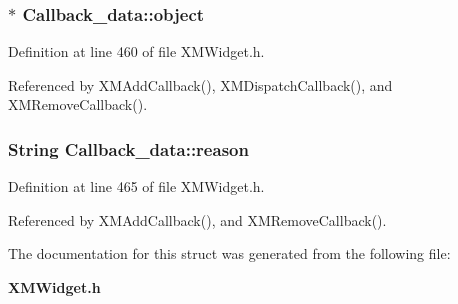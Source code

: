 \subsubsection{$\ast$ Callback\_\-data::object}\label{structCallback__data_m0}




Definition at line 460 of file XMWidget.h.

Referenced by XMAdd\-Callback(), XMDispatch\-Callback(), and XMRemove\-Callback().
\subsubsection{\setlength{\rightskip}{0pt plus 5cm}String Callback\_\-data::reason}\label{structCallback__data_m3}




Definition at line 465 of file XMWidget.h.

Referenced by XMAdd\-Callback(), and XMRemove\-Callback().

The documentation for this struct was generated from the following file:\begin{CompactItemize}
\item 
{\bf XMWidget.h}\end{CompactItemize}
